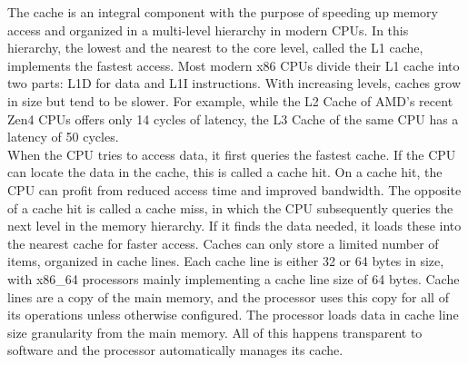 
The cache is an integral component with the purpose of speeding up memory access
and organized in a multi-level hierarchy in modern CPUs. In this hierarchy, the
lowest and the nearest to the core level, called the L1 cache, implements the
fastest access. Most modern x86 CPUs divide their L1 cache into two parts: L1D
for data and L1I instructions. With increasing levels, caches grow in size but
tend to be slower. For example, while the L2 Cache of AMD's recent Zen4 CPUs
offers only 14 cycles of latency, the L3 Cache of the same CPU has a latency of
50 cycles\cite{zen4}.\\

When the CPU tries to access data, it first queries the fastest cache. If the
CPU can locate the data in the cache, this is called a cache hit. On a cache
hit, the CPU can profit from reduced access time and improved bandwidth. The
opposite of a cache hit is called a cache miss, in which the CPU subsequently
queries the next level in the memory hierarchy. If it finds the data needed, it
loads these into the nearest cache for faster access. Caches can only store a
limited number of items, organized in cache lines. Each cache line is either 32
or 64 bytes in size, with x86\_64 processors mainly implementing a cache line
size of 64 bytes. Cache lines are a copy of the main memory, and the processor
uses this copy for all of its operations unless otherwise configured. The
processor loads data in cache line size granularity from the main memory. All of
this happens transparent to software and the processor automatically manages its
cache. \\

